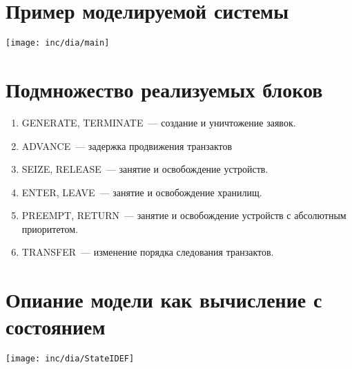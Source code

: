 \documentclass[12pt]{article}
\begin{document}




\section{Пример моделируемой системы}

\texttt{[image: inc/dia/main]}


\section{Подмножество реализуемых блоков}

\begin{enumerate}
\item GENERATE, TERMINATE~--- создание и уничтожение заявок.
\item ADVANCE~--- задержка продвижения транзактов
\item SEIZE, RELEASE~--- занятие и освобождение устройств.
\item ENTER, LEAVE~--- занятие и освобождение хранилищ.
\item PREEMPT, RETURN~--- занятие и освобождение устройств с абсолютным приоритетом.
\item TRANSFER~--- изменение порядка следования транзактов.
\end{enumerate}

\section{Опиание модели как вычисление с состоянием}

\texttt{[image: inc/dia/StateIDEF]}
\end{document}
